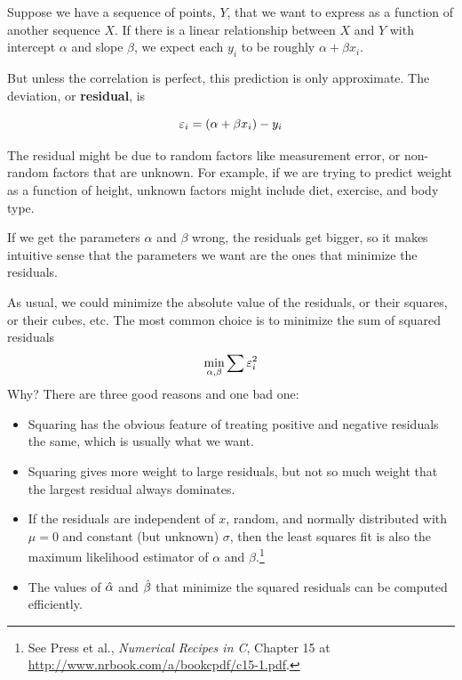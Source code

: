 \documentclass[12pt]{book}
\begin{document}
Suppose we have a sequence of points, $Y$, that we want to express as a
function of another sequence $X$.  If there is a linear relationship
between $X$ and $Y$ with intercept $\alpha$ and slope $\beta$, we
expect each $y_i$ to be roughly $\alpha + \beta x_i$.

But unless the correlation is perfect, this prediction is only
approximate.  The deviation, or {\bf residual}, is 

\[ \varepsilon_i = (\alpha + \beta x_i) - y_i \]

The residual might be due to random factors like measurement error,
or non-random factors that are unknown.  For example, if we are
trying to predict weight as a function of height, unknown factors
might include diet, exercise, and body type.

If we get the parameters $\alpha$ and $\beta$ wrong, the residuals
get bigger, so it makes intuitive sense that the parameters we want
are the ones that minimize the residuals.

As usual, we could minimize the absolute value of the
residuals, or their squares, or their cubes, etc.  The most common
choice is to minimize the sum of squared residuals
%
\[ \min_{\alpha, \beta} \sum \varepsilon_i^2 \]
%
Why?  There are three good reasons and one bad one:

\begin{itemize}

\item Squaring has the obvious feature of treating positive and
negative residuals the same, which is usually what we want.

\item Squaring gives more weight to large residuals, but not
so much weight that the largest residual always dominates.

\item If the residuals are independent of $x$, random, and normally
  distributed with $\mu = 0$ and constant (but unknown) $\sigma$, then
  the least squares fit is also the maximum likelihood estimator of
  $\alpha$ and $\beta$.\footnote{See Press et al., {\em Numerical Recipes in C},
    Chapter 15 at \url{http://www.nrbook.com/a/bookcpdf/c15-1.pdf}.}

\item The values of $\hat{\alpha}$ and $\hat{\beta}$ that minimize
  the squared residuals can be computed efficiently.

\end{itemize}
\end{document}
